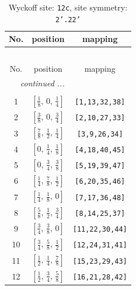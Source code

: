 \documentclass[fleqn,8pt]{jsarticle}
\begin{document}
\begin{longtable}{ccc}
\caption{Wyckoff site: {\tt 12c}, site symmetry: {\tt 2'.22'}}
 \\
 \hline \hline
No. & position & mapping \\ \hline \endfirsthead

\multicolumn{2}{l}{\tablename\ \thetable{}} \\
 \hline \hline
No. & position & mapping \\ \hline \endhead

 \hline \hline
\multicolumn{2}{r}{\footnotesize\it continued ...} \\ \endfoot

 \hline \hline
\multicolumn{2}{r}{} \\ \endlastfoot

1 & $\left[ \frac{1}{8},\, 0,\, \frac{1}{4} \right]$ & {\tt [1,13,32,38]} \\ \hline
2 & $\left[ \frac{3}{8},\, 0,\, \frac{3}{4} \right]$ & {\tt [2,10,27,33]} \\ \hline
3 & $\left[ \frac{7}{8},\, \frac{1}{2},\, \frac{1}{4} \right]$ & {\tt [3,9,26,34]} \\ \hline
4 & $\left[ 0,\, \frac{1}{4},\, \frac{1}{8} \right]$ & {\tt [4,18,40,45]} \\ \hline
5 & $\left[ 0,\, \frac{3}{4},\, \frac{3}{8} \right]$ & {\tt [5,19,39,47]} \\ \hline
6 & $\left[ \frac{1}{4},\, \frac{7}{8},\, \frac{1}{2} \right]$ & {\tt [6,20,35,46]} \\ \hline
7 & $\left[ \frac{1}{4},\, \frac{1}{8},\, 0 \right]$ & {\tt [7,17,36,48]} \\ \hline
8 & $\left[ \frac{5}{8},\, \frac{1}{2},\, \frac{3}{4} \right]$ & {\tt [8,14,25,37]} \\ \hline
9 & $\left[ \frac{3}{4},\, \frac{3}{8},\, 0 \right]$ & {\tt [11,22,30,44]} \\ \hline
10 & $\left[ \frac{3}{4},\, \frac{5}{8},\, \frac{1}{2} \right]$ & {\tt [12,24,31,41]} \\ \hline
11 & $\left[ \frac{1}{2},\, \frac{1}{4},\, \frac{7}{8} \right]$ & {\tt [15,23,29,43]} \\ \hline
12 & $\left[ \frac{1}{2},\, \frac{3}{4},\, \frac{5}{8} \right]$ & {\tt [16,21,28,42]} \\
\end{longtable}
\renewcommand{\arraystretch}{1.2}
\end{document}
